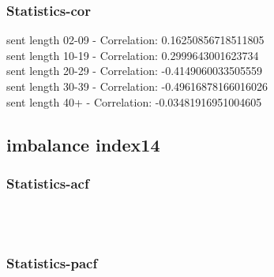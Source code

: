 \documentclass{article}%
\begin{document}
%
\newpage%
\subsubsection{Statistics{-}cor}%
\label{ssubsec:Statistics{-}cor}%
\noindent%
sent length 02-09 - Correlation: 0.16250856718511805\\%
sent length 10-19 - Correlation: 0.2999643001623734\\%
sent length 20-29 - Correlation: -0.4149060033505559\\%
sent length 30-39 - Correlation: -0.49616878166016026\\%
sent length 40+ - Correlation: -0.03481916951004605\\

%
\newpage

%
\subsection{imbalance index14}%
\label{subsec:imbalanceindex14}%
\subsubsection{Statistics{-}acf}%
\label{ssubsec:Statistics{-}acf}%


\begin{figure}[ht]%
\centering%
\setlength{\abovecaptionskip}{-35pt}%
%
%
\\%
%
%
\\%
%
\end{figure}

%
\newpage%
\subsubsection{Statistics{-}pacf}%
\label{ssubsec:Statistics{-}pacf}%
\end{document}
